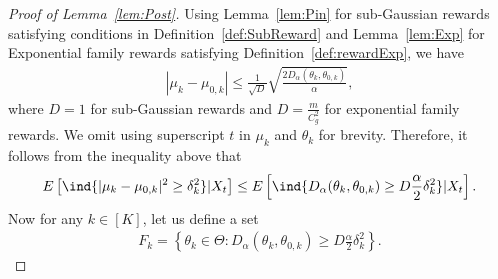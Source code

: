\documentclass[11pt]{article}
\begin{document}
\begin{proof}[Proof of Lemma~\ref{lem:Post}]
    Using Lemma~\ref{lem:Pin} for sub-Gaussian rewards satisfying conditions in Definition~\ref{def:SubReward}   and Lemma~\ref{lem:Exp} for Exponential family rewards satisfying Definition~\ref{def:rewardExp}, we have
    \begin{align}
        \left|   \mu_k-\mu_{0,k}  \right| %
        \leq \frac{1}{\sqrt{D}}\sqrt{\frac{2D_{\alpha}(\theta_k,\theta_{0,k}) }{\alpha}},
        \label{eq:Pins}
        \end{align}
    where $D=1$ for sub-Gaussian rewards and $D=\frac{m}{C_g^2}$ for exponential family rewards. We omit using superscript $t$ in $\mu_k$ and $\theta_k$ for brevity.
    Therefore, it follows from the inequality above that 
    \begin{align}
        E\left[ \ind\{|\mu_k -\mu_{0,k} |^2 \geq \delta_k^2 \} | X_{t} \right] \leq E\left[ \ind\{D_{\alpha}(\theta_k,\theta_{0,k}) \geq D \frac{\alpha}{2} \delta_k^2  \} | X_{t} \right].
        \label{eq:MABDE2}
    \end{align} 
   Now for any $k\in[K]$, let us define a set 
    \begin{align}
        F_k = \left\{\theta_k \in \Theta: D_{\alpha}(\theta_k,\theta_{0,k}) \geq D \frac{\alpha}{2} \delta_k^2  \right\}.
        \label{eq:MABDE2b}
    \end{align}


\end{proof}
\end{document}
